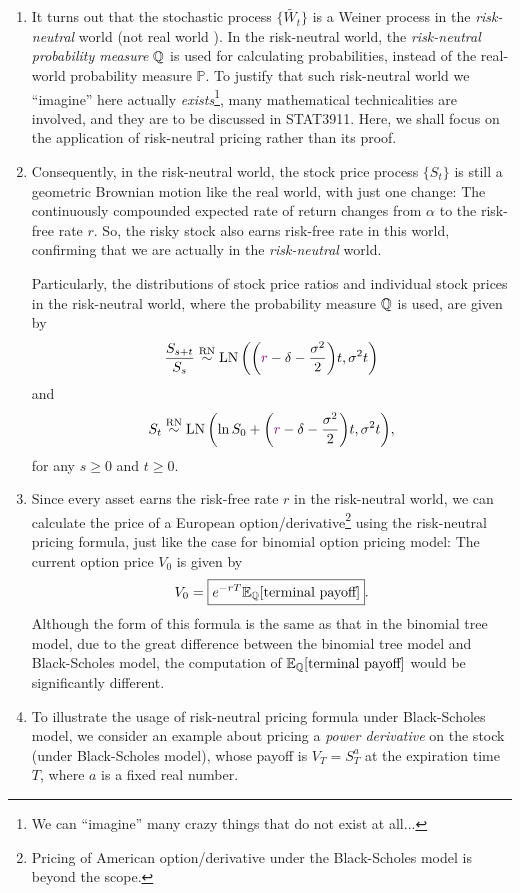 \begin{enumerate}
\item It turns out that the stochastic process \(\{\widetilde{W_t}\}\) is a Weiner
process in the \emph{risk-neutral} world (not real world \warn{}). In the
risk-neutral world, the \emph{risk-neutral probability measure} \(\mathbb{Q}\) is used
for calculating probabilities, instead of the real-world probability measure
\(\mathbb{P}\). To justify that such risk-neutral world we ``imagine'' here
actually \emph{exists}\footnote{We can ``imagine'' many crazy things that do not
exist at all...}, many mathematical technicalities are involved, and they are
to be discussed in STAT3911. Here, we shall focus on the application of
risk-neutral pricing rather than its proof.

\item Consequently, in the risk-neutral world, the stock price process
\(\{S_t\}\) is still a geometric Brownian motion like the real world, with just
one change: The continuously compounded expected rate of return changes from
\(\alpha\) to the risk-free rate \(r\). So, the risky stock also earns
risk-free rate in this world, confirming that we are actually in the
\emph{risk-neutral} world.

Particularly, the distributions of stock price ratios and individual stock
prices in the risk-neutral world, where the probability measure \(\mathbb{Q}\) is used,
are given by
\[
\frac{S_{s+t}}{S_s}\overset{\mathrm{RN}}{\sim}\operatorname{LN}\qty(\qty({\color{violet}r}-\delta-\frac{\sigma^2}{2})t,\sigma^{2}t)
\]
and
\[
S_t\overset{\mathrm{RN}}{\sim}\operatorname{LN}\qty(\ln S_0+\qty({\color{violet}r}-\delta-\frac{\sigma^2}{2})t,\sigma^{2}t),
\]
for any \(s\ge 0\) and \(t\ge 0\).

\item \label{it:bs-rn-pricing-fmla}
Since every asset earns the risk-free rate \(r\) in the risk-neutral
world, we can calculate the price of a European
option/derivative\footnote{Pricing of American option/derivative under the
Black-Scholes model is beyond the scope.} using the risk-neutral pricing
formula, just like the case for binomial option pricing model: The current
option price \(V_0\) is given by
\[
V_0=\boxed{e^{-rT}\mathbb{E}_{\mathbb{Q}}\qty[\text{terminal payoff}]}.
\]
Although the form of this formula is the same as that in the binomial tree
model, due to the great difference between the binomial tree model and
Black-Scholes model, the computation of \(\mathbb{E}_{\mathbb{Q}}\qty[\text{terminal payoff}]\)
would be significantly different.

\item To illustrate the usage of risk-neutral pricing formula under
Black-Scholes model, we consider an example about pricing a \emph{power
derivative} on the stock  (under Black-Scholes model), whose
payoff is \(V_T=S_T^{a}\) at the expiration time \(T\), where \(a\) is a fixed
real number.


\end{enumerate}
